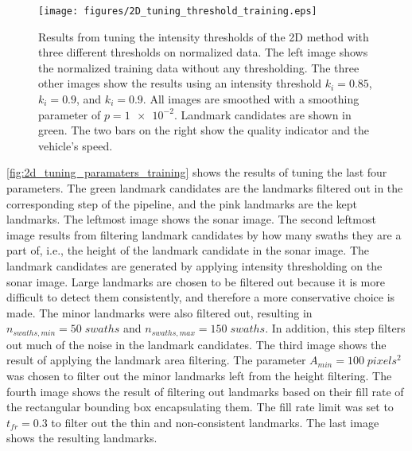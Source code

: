 \begin{figure}[ht]  %
  \centering
  \texttt{[image: figures/2D\_tuning\_threshold\_training.eps]}
  \caption[Results of tuning intensity threshold the 2D method]{Results from tuning the intensity thresholds of the 2D method with three different thresholds on normalized data. The left image shows the normalized training data without any thresholding. The three other images show the results using an intensity threshold $k_i = 0.85$, $k_i = 0.9$, and $k_i = 0.9$. All images are smoothed with a smoothing parameter of $p = \num{1e-2}$. Landmark candidates are shown in green. The two bars on the right show the quality indicator and the vehicle's speed.}
  \label{fig:2D_tuning_intensity_thres}
\end{figure}

\cref{fig:2d_tuning_paramaters_training} shows the results of tuning the last four parameters. The green landmark candidates are the landmarks filtered out in the corresponding step of the pipeline, and the pink landmarks are the kept landmarks. The leftmost image shows the sonar image. The second leftmost image results from filtering landmark candidates by how many swaths they are a part of, i.e., the height of the landmark candidate in the sonar image. The landmark candidates are generated by applying intensity thresholding on the sonar image. Large landmarks are chosen to be filtered out because it is more difficult to detect them consistently, and therefore a more conservative choice is made. The minor landmarks were also filtered out, resulting in $n_{swaths, min} = 50 \; swaths$ and $n_{swaths, max} = 150 \; swaths$. In addition, this step filters out much of the noise in the landmark candidates. The third image shows the result of applying the landmark area filtering. The parameter $A_{min} = 100 \;pixels^2$ was chosen to filter out the minor landmarks left from the height filtering. The fourth image shows the result of filtering out landmarks based on their fill rate of the rectangular bounding box encapsulating them. The fill rate limit was set to $t_{fr} = 0.3$ to filter out the thin and non-consistent landmarks. The last image shows the resulting landmarks.

